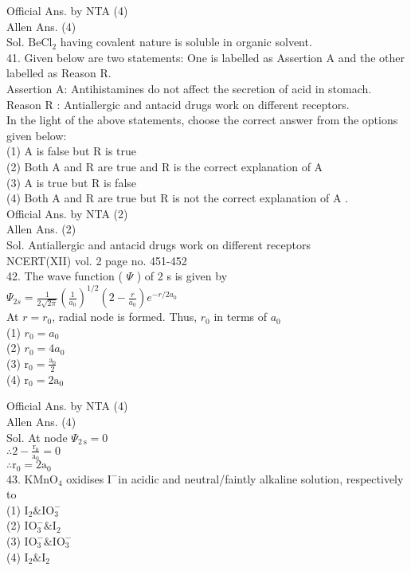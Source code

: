 \documentclass[10pt]{article}
\begin{document}
Official Ans. by NTA (4)\\
Allen Ans. (4)\\
Sol. \(\mathrm{BeCl}_{2}\) having covalent nature is soluble in organic solvent.\\
41. Given below are two statements: One is labelled as Assertion A and the other labelled as Reason R.\\
Assertion A: Antihistamines do not affect the secretion of acid in stomach.\\
Reason R : Antiallergic and antacid drugs work on different receptors.\\
In the light of the above statements, choose the correct answer from the options given below:\\
(1) A is false but R is true\\
(2) Both A and R are true and R is the correct explanation of A\\
(3) A is true but R is false\\
(4) Both A and R are true but R is not the correct explanation of A .\\
Official Ans. by NTA (2)\\
Allen Ans. (2)\\
Sol. Antiallergic and antacid drugs work on different receptors\\
NCERT(XII) vol. 2 page no. 451-452\\
42. The wave function ( \(\Psi\) ) of 2 s is given by\\
\(\Psi_{2 s}=\frac{1}{2 \sqrt{2 \pi}}\left(\frac{1}{a_{0}}\right)^{1 / 2}\left(2-\frac{r}{a_{0}}\right) e^{-r / 2 a_{0}}\)\\
At \(r=r_{0}\), radial node is formed. Thus, \(r_{0}\) in terms of \(a_{0}\)\\
(1) \(r_{0}=a_{0}\)\\
(2) \(r_{0}=4 a_{0}\)\\
(3) \(\mathrm{r}_{0}=\frac{\mathrm{a}_{0}}{2}\)\\
(4) \(\mathrm{r}_{0}=2 \mathrm{a}_{0}\)

Official Ans. by NTA (4)\\
Allen Ans. (4)\\
Sol. At node \(\Psi_{2 \mathrm{~s}}=0\)\\
\(\therefore 2-\frac{\mathrm{r}_{0}}{\mathrm{a}_{0}}=0\)\\
\(\therefore \mathrm{r}_{0}=2 \mathrm{a}_{0}\)\\
43. \(\mathrm{KMnO}_{4}\) oxidises \(\mathrm{I}^{-}\)in acidic and neutral/faintly alkaline solution, respectively to\\
(1) \(\mathrm{I}_{2} \& \mathrm{IO}_{3}^{-}\)\\
(2) \(\mathrm{IO}_{3}^{-} \& \mathrm{I}_{2}\)\\
(3) \(\mathrm{IO}_{3}^{-} \& \mathrm{IO}_{3}^{-}\)\\
(4) \(\mathrm{I}_{2} \& \mathrm{I}_{2}\)
\end{document}
